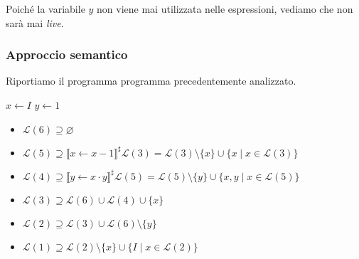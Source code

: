 Poiché la variabile $y$ non viene mai utilizzata nelle espressioni, vediamo che non sarà 
mai \textit{live}.

\subsubsection{Approccio semantico}

\begin{minipage}{0.5\textwidth}
    Riportiamo il programma programma precedentemente analizzato.

    \begin{algorithm}[H]
        $x \gets I$\;
        $y \gets 1$\;
    \end{algorithm}
\end{minipage}
\begin{minipage}{0.5\textwidth}
    \begin{figure}[H]
        \centering
    \end{figure}
\end{minipage}

\begin{itemize}
    \item $\mathcal{L}(6) \supseteq \varnothing$
    \item $\mathcal{L}(5) \supseteq \llbracket x \gets x - 1\rrbracket^\sharp \mathcal{L}(3)
    = \mathcal{L}(3) \setminus \{x\} \cup \{ x \mid x \in \mathcal{L}(3)\}$
    \item $\mathcal{L}(4) \supseteq \llbracket y \gets x \cdot y\rrbracket^\sharp \mathcal{L}(5)
    = \mathcal{L}(5) \setminus \{y\} \cup \{ x,y \mid x \in \mathcal{L}(5) \}$
    \item $\mathcal{L}(3) \supseteq \mathcal{L}(6) \cup \mathcal{L}(4)\cup \{x\}$
    \item $\mathcal{L}(2) \supseteq \mathcal{L}(3) \cup \mathcal{L}(6) \setminus \{y\}$
    \item $\mathcal{L}(1) \supseteq \mathcal{L}(2) \setminus \{x\} \cup \{I \mid x \in \mathcal{L}(2)\}$
\end{itemize}

